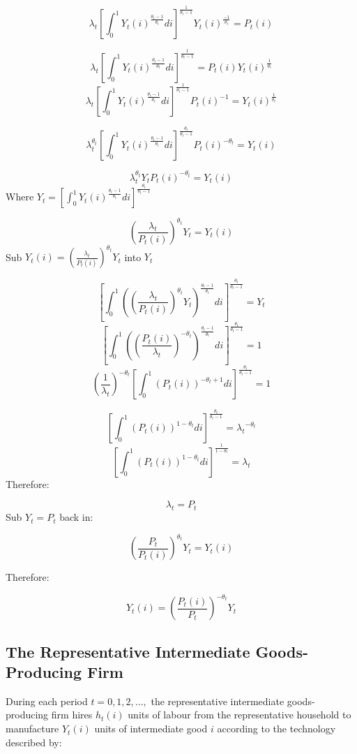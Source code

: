 \documentclass[11pt,preprint, authoryear]{elsarticle}
\numberwithin{equation}{section}
\numberwithin{figure}{section}
\numberwithin{table}{section}
\begin{document}
\[ \lambda_t[\int_0^1 Y_t(i)^{\frac{\theta_t-1}{\theta_t}} di]^{\frac{1}{\theta_t-1}} Y_t(i)^{\frac{-1}{\theta_t}} = P_t(i)\]

\[ \lambda_t[\int_0^1 Y_t(i)^{\frac{\theta_t-1}{\theta_t}} di]^{\frac{1}{\theta_t-1}}  = P_t(i)Y_t(i)^{\frac{1}{\theta_t}}\]
\[ \lambda_t[\int_0^1 Y_t(i)^{\frac{\theta_t-1}{\theta_t}} di]^{\frac{1}{\theta_t-1}}P_t(i)^{-1}  = Y_t(i)^{\frac{1}{\theta_t}}\]

\[ \lambda_t^{\theta_t} [\int_0^1 Y_t(i)^{\frac{\theta_t-1}{\theta_t}} di]^{\frac{\theta_t}{\theta_t-1}}P_t(i)^{-\theta_t}  = Y_t(i)\]

\[ \lambda_t^{\theta_t} Y_t P_t(i)^{-\theta_t} = Y_t(i)\] Where
\(Y_t = [\int_0^1 Y_t(i)^{\frac{\theta_t-1}{\theta_t}} di]^{\frac{\theta_t}{\theta_t-1}}\)

\[ (\frac{\lambda_t}{P_t(i)})^{\theta_t} Y_t  = Y_t(i)\] Sub
\(Y_t(i) = (\frac{\lambda_t}{P_t(i)})^{\theta_t} Y_t\) into \(Y_t\)

\[[\int_0^1 ((\frac{\lambda_t}{P_t(i)})^{\theta_t} Y_t)^{\frac{\theta_t-1}{\theta_t}} di]^{\frac{\theta_t}{\theta_t-1}}  = Y_t\]
\[[\int_0^1 ((\frac{P_t(i)}{\lambda_t})^{-\theta_t})^{\frac{\theta_t-1}{\theta_t}} di]^{\frac{\theta_t}{\theta_t-1}}  = 1\]
\[(\frac{1}{\lambda_t})^{-\theta_t}[\int_0^1 (P_t(i))^{-\theta_t+1} di]^{\frac{\theta_t}{\theta_t-1}}  = 1\]

\[[\int_0^1 (P_t(i))^{1-\theta_t} di]^{\frac{\theta_t}{\theta_t-1}}  = {\lambda_t}^{-\theta_t}\]
\[[\int_0^1 (P_t(i))^{1-\theta_t} di]^{\frac{1}{1-\theta_t}}  = {\lambda_t}\]
Therefore:

\[\lambda_t = P_t\] Sub \(Y_t = P_t\) back in:

\[(\frac{P_t}{P_t(i)})^{\theta_t} Y_t = Y_t(i)\]

Therefore:

\[Y_t(i) = (\frac{P_t(i)}{P_t})^{-\theta_t} Y_t\]

\hypertarget{the-representative-intermediate-goods-producing-firm}{%
\subsection{The Representative Intermediate Goods-Producing
Firm}\label{the-representative-intermediate-goods-producing-firm}}

During each period \(t=0,1,2,...,\) the representative intermediate
goods-producing firm hires \(h_t(i)\) units of labour from the
representative household to manufacture \(Y_t(i)\) units of intermediate
good \(i\) according to the technology described by:
\end{document}
